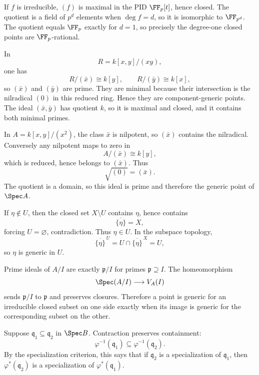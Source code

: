 \begin{solution}[E15]
If $f$ is irreducible, $(f)$ is maximal in the PID $\FF_p[t]$, hence closed.  The quotient
is a field of $p^d$ elements when $\deg f=d$, so it is isomorphic to $\FF_{p^d}$.  The
quotient equals $\FF_p$ exactly for $d=1$, so precisely the degree-one closed points are
$\FF_p$-rational.
\end{solution}

\begin{solution}[E16]
In
\[
R=k[x,y]/(xy),
\]
one has
\[
R/(\bar x)\cong k[y],\qquad R/(\bar y)\cong k[x],
\]
so $(\bar x)$ and $(\bar y)$ are prime.  They are minimal because their intersection is
the nilradical $(0)$ in this reduced ring.  Hence they are component-generic points.  The
ideal $(\bar x,\bar y)$ has quotient $k$, so it is maximal and closed, and it contains both
minimal primes.
\end{solution}

\begin{solution}[E17]
In $A=k[x,y]/(x^2)$, the class $\bar x$ is nilpotent, so $(\bar x)$ contains the
nilradical.  Conversely any nilpotent maps to zero in
\[
A/(\bar x)\cong k[y],
\]
which is reduced, hence belongs to $(\bar x)$.  Thus
\[
\sqrt{(0)}=(\bar x).
\]
The quotient is a domain, so this ideal is prime and therefore the generic point of
$\Spec A$.
\end{solution}

\begin{solution}[E18]
If $\eta\notin U$, then the closed set $X\setminus U$ contains $\eta$, hence contains
\[
\overline{\{\eta\}}=X,
\]
forcing $U=\varnothing$, contradiction.  Thus $\eta\in U$.  In the subspace topology,
\[
\overline{\{\eta\}}^{\,U}
=
U\cap\overline{\{\eta\}}^{\,X}
=
U,
\]
so $\eta$ is generic in $U$.
\end{solution}

\begin{solution}[E19]
Prime ideals of $A/I$ are exactly $\mathfrak p/I$ for primes $\mathfrak p\supseteq I$.
The homeomorphism
\[
\Spec(A/I)\longrightarrow V_A(I)
\]
sends $\mathfrak p/I$ to $\mathfrak p$ and preserves closures.  Therefore a point is
generic for an irreducible closed subset on one side exactly when its image is generic for
the corresponding subset on the other.
\end{solution}

\begin{solution}[E20]
Suppose $\mathfrak q_1\subseteq\mathfrak q_2$ in $\Spec B$.  Contraction preserves
containment:
\[
\varphi^{-1}(\mathfrak q_1)\subseteq\varphi^{-1}(\mathfrak q_2).
\]
By the specialization criterion, this says that if $\mathfrak q_2$ is a specialization
of $\mathfrak q_1$, then $\varphi^\ast(\mathfrak q_2)$ is a specialization of
$\varphi^\ast(\mathfrak q_1)$.
\end{solution}

